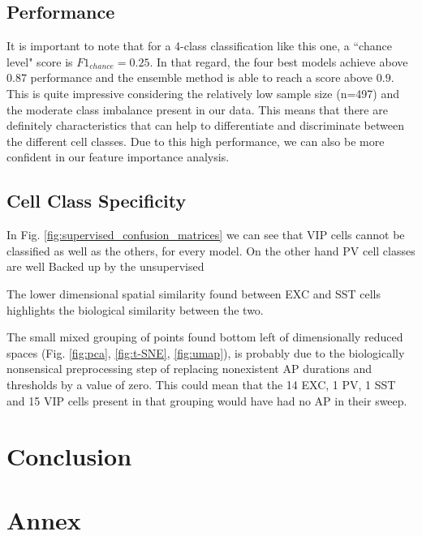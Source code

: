 \documentclass{IEEEtran}
\begin{document}
\subsection{Performance}
It is important to note that for a 4-class classification like this one, a ``chance level" score is $F1_{chance}=0.25$.
In that regard, the four best models achieve above $0.87$ performance and the ensemble method is able to reach a score above $0.9$. This is quite impressive considering the relatively low sample size (n=497) and the moderate class imbalance present in our data. This means that there are definitely characteristics that can help to differentiate and discriminate between the different cell classes. Due to this high performance, we can also be more confident in our feature importance analysis.

\subsection{Cell Class Specificity}
In Fig. \ref{fig:supervised_confusion_matrices} we can see that VIP cells cannot be classified as well as the others, for every model. 
On the other hand PV cell classes are well 
Backed up by the unsupervised

The lower dimensional spatial similarity found between EXC and SST cells highlights the biological similarity between the two.

The small mixed grouping of points found bottom left of dimensionally reduced spaces (Fig. \ref{fig:pca}, \ref{fig:t-SNE}, \ref{fig:umap}), is probably due to the biologically nonsensical preprocessing step of replacing nonexistent AP durations and thresholds by a value of zero. This could mean that the 14 EXC, 1 PV, 1 SST and 15 VIP cells present in that grouping would have had no AP in their sweep.



\section{Conclusion}


\newpage
\section{Annex}

\end{document}
